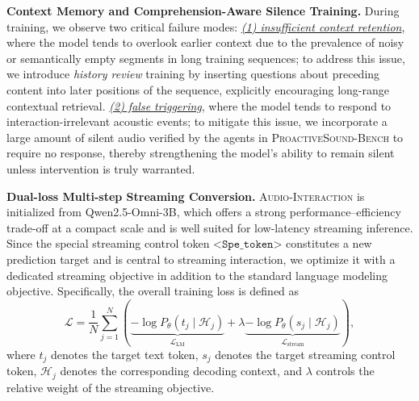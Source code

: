\documentclass{llmxive}
\begin{document}

\textbf{Context Memory and Comprehension-Aware Silence Training.}  During training, we observe two critical failure modes: \underline{\textit{(1) insufficient context retention}}, where the model tends to overlook earlier context due to the prevalence of noisy or semantically empty segments in long training sequences; to address this issue, we introduce \emph{history review} training by inserting questions about preceding content into later positions of the sequence, explicitly encouraging long-range contextual retrieval. \underline{\textit{(2) false triggering}}, where the model tends to respond to interaction-irrelevant acoustic events; to mitigate this issue, we incorporate a large amount of silent audio verified by the agents in \textsc{ProactiveSound-Bench} to require no response, thereby strengthening the model's ability to remain silent unless intervention is truly warranted.

\textbf{Dual-loss Multi-step Streaming Conversion.}  \textsc{Audio-Interaction} is initialized from Qwen2.5-Omni-3B, which offers a strong performance--efficiency trade-off at a compact scale and is well suited for low-latency streaming inference. Since the special streaming control token $\texttt{<Spe\_token>}$ constitutes a new prediction target and is central to streaming interaction, we optimize it with a dedicated streaming objective in addition to the standard language modeling objective. Specifically, the overall training loss is defined as
\[
\mathcal{L}
=
\frac{1}{N}\sum_{j=1}^{N}
\left(
\underbrace{-\log P_\theta\!\left(t_j \mid \mathcal{H}_j\right)}_{\mathcal{L}_{\mathrm{LM}}}
+
\lambda\underbrace{-\log P_\theta\!\left(s_j \mid \mathcal{H}_j\right)}_{\mathcal{L}_{\mathrm{stream}}}
\right),
\]
where $t_j$ denotes the target text token, $s_j$ denotes the target streaming control token, $\mathcal{H}_j$ denotes the corresponding decoding context, and $\lambda$ controls the relative weight of the streaming objective.
\end{document}
